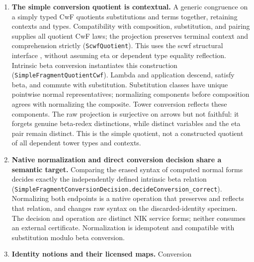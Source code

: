 \documentclass[11pt]{article}
\theoremstyle{definition}
\theoremstyle{remark}
\begin{document}
\begin{enumerate}
\[    \operatorname{erase}(t)\quad\Longleftrightarrow\quad s =_\beta t.
  \]
  The tower conversion path may leave the simple image; the tower is the
  sealed presentation without additional declaration-specific computation
  (\nolinkurl{SimpleFragmentConversionDecision.towerConv_iff_betaConv}).
  Thus erasure induces an injective map of conversion classes, and simple
  beta classes are equivalent to their intrinsic normal-form representatives.
  This is equational conservativity on an image, not reflection of
  inhabitation or fullness of a model reduct. The normalization method uses
  the standard distinction between strong normalization and uniqueness of
  normal forms \cite{SelingerLambdaNotes}.
\item \textbf{The simple conversion quotient is contextual.}
  A generic congruence on a simply typed CwF quotients substitutions and
  terms together, retaining contexts and types. Compatibility with
  composition, substitution, and pairing supplies all quotient CwF laws;
  the projection preserves terminal context and comprehension strictly
  (\nolinkurl{ScwfQuotient}). This uses the scwf structural interface
  \cite{CastellanClairambaultDybjerCwfs}, without assuming eta or dependent
  type equality reflection. Intrinsic beta conversion instantiates this
  construction (\nolinkurl{SimpleFragmentQuotientCwf}). Lambda and application
  descend, satisfy beta, and commute with substitution. Substitution classes
  have unique pointwise normal representatives; normalizing components
  before composition agrees with normalizing the composite. Tower conversion
  reflects these components. The raw projection is surjective on arrows but
  not faithful: it forgets genuine beta-redex distinctions, while distinct
  variables and the eta pair remain distinct. This is the simple quotient,
  not a constructed quotient of all dependent tower types and contexts.
\item \textbf{Native normalization and direct conversion decision share a
  semantic target.} Comparing the erased syntax of computed normal forms
  decides exactly the independently defined intrinsic beta relation
  (\nolinkurl{SimpleFragmentConversionDecision.decideConversion_correct}).
  Normalizing both endpoints is a native operation that preserves and
  reflects that relation, and changes raw syntax on the discarded-identity
  specimen. The decision and operation are distinct NIK service forms;
  neither consumes an external certificate. Normalization is idempotent
  and compatible with substitution modulo beta conversion.
\item \textbf{Identity notions and their licensed maps.}  Conversion

\end{enumerate}
\end{document}
